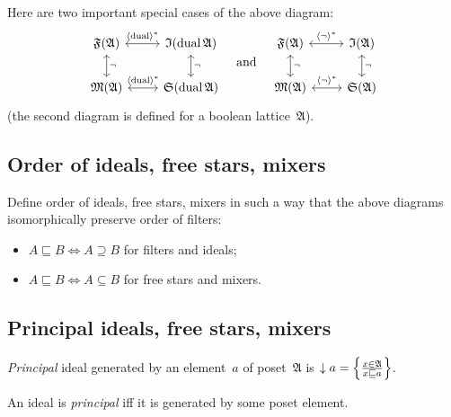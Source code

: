 Here are two important special cases of the above diagram:\begin{equation}\label{two-diags}\begin{tikzcd}
  \mathfrak{F}(\mathfrak{A})
	\arrow[d, leftrightarrow, "\lnot"]
    \arrow[r, leftrightarrow, "\rsupfun{\dual}"]
    & \mathfrak{I}(\dual\mathfrak{A}) \arrow[d, leftrightarrow, "\lnot"] \\
  \mathfrak{M}(\mathfrak{A})
	\arrow[r, leftrightarrow, "\rsupfun{\dual}"]
    & \mathfrak{S}(\dual\mathfrak{A})
\end{tikzcd}
\quad\text{and}\quad
\begin{tikzcd}
  \mathfrak{F}(\mathfrak{A})
	\arrow[d, leftrightarrow, "\lnot"]
    \arrow[r, leftrightarrow, "\rsupfun{\lnot}"]
    & \mathfrak{I}(\mathfrak{A}) \arrow[d, leftrightarrow, "\lnot"] \\
  \mathfrak{M}(\mathfrak{A})
	\arrow[r, leftrightarrow, "\rsupfun{\lnot}"]
    & \mathfrak{S}(\mathfrak{A})
\end{tikzcd}
\end{equation}(the second diagram is defined for a boolean lattice~$\mathfrak{A}$).


\subsection{Order of ideals, free stars, mixers}

Define order of ideals, free stars, mixers in such a way that the
above diagrams isomorphically preserve order of filters:
\begin{itemize}
\item $A\sqsubseteq B\Leftrightarrow A\supseteq B$ for filters and ideals;
\item $A\sqsubseteq B\Leftrightarrow A\subseteq B$ for free stars and mixers.
\end{itemize}

\subsection{Principal ideals, free stars, mixers}
\begin{defn}
\emph{Principal} ideal generated by an element~$a$ of poset~$\mathfrak{A}$
is $\downarrow a=\left\{ \frac{x\in\mathfrak{A}}{x\sqsubseteq a}\right\}$.
\end{defn}

\begin{defn}
An ideal is \emph{principal} iff it is generated by some poset element.
\end{defn}

